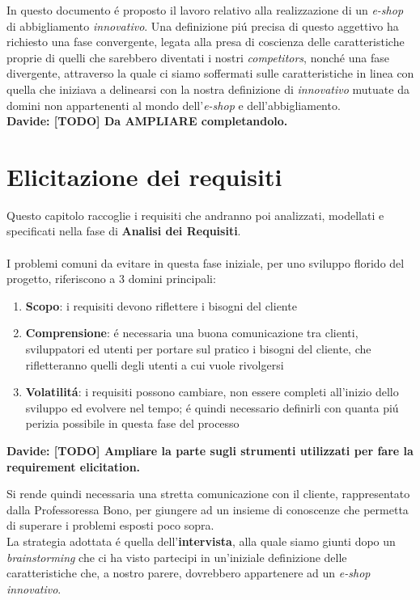 \documentclass[12pt]{article}
\newcommand{\davide}[1]{{\bf \color{chromeyellow} Davide: #1 }}
\begin{document}
\newpage

\tableofcontents


\newpage

\abstract{}
In questo documento \'e proposto il lavoro relativo alla realizzazione di un \textit{e-shop} di abbigliamento \textit{innovativo}. Una definizione pi\'u precisa di questo aggettivo ha richiesto una fase convergente, legata alla presa di coscienza delle caratteristiche proprie di quelli che sarebbero diventati i nostri \textit{competitors}, nonch\'e una fase divergente, attraverso la quale ci siamo soffermati sulle caratteristiche in linea con quella che iniziava a delinearsi con la nostra definizione di \textit{innovativo} mutuate da domini non appartenenti al mondo dell'\textit{e-shop} e dell'abbigliamento. 
\\
\davide{[TODO] Da AMPLIARE completandolo.}

\newpage

\section{Elicitazione dei requisiti}
Questo capitolo raccoglie i requisiti che andranno poi analizzati, modellati e specificati nella fase di \textbf{Analisi dei Requisiti}. 
\\
\\
I problemi comuni da evitare in questa fase iniziale, per uno sviluppo florido del progetto, riferiscono a 3 domini principali:
\begin{enumerate}
	\item \textbf{Scopo}: i requisiti devono riflettere i bisogni del cliente
	\item \textbf{Comprensione}: \'e necessaria una buona comunicazione tra clienti, sviluppatori ed utenti per portare sul pratico i bisogni del cliente, che rifletteranno quelli degli utenti a cui vuole rivolgersi
	\item \textbf{Volatilit\'a}: i requisiti possono cambiare, non essere completi all'inizio dello sviluppo ed evolvere nel tempo; \'e quindi necessario definirli con quanta pi\'u perizia possibile in questa fase del processo
\end{enumerate}

\davide{\textbf{[TODO]} Ampliare la parte sugli strumenti utilizzati per fare la requirement elicitation.}

Si rende quindi necessaria una stretta comunicazione con il cliente, rappresentato dalla Professoressa Bono, per giungere ad un insieme di conoscenze che permetta di superare i problemi esposti poco sopra. \\
La strategia adottata \'e quella dell'\textbf{intervista}, alla quale siamo giunti dopo un \textit{brainstorming} che ci ha visto partecipi in un'iniziale definizione delle caratteristiche che, a nostro parere, dovrebbero appartenere ad un \textit{e-shop innovativo}.
\end{document}
